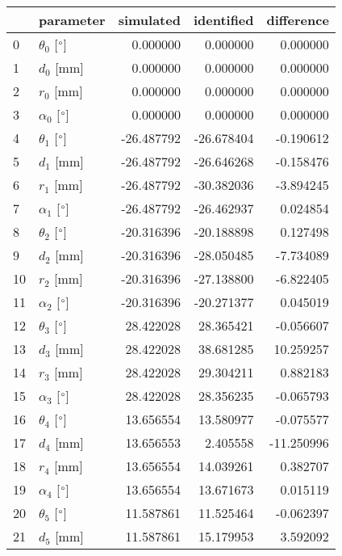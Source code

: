 \documentclass{standalone}%
\begin{document}
%
\normalsize%
\begin{tabular}{llrrr}
\toprule
{} &                 parameter &  simulated & identified & difference \\
\midrule
0  &  $\theta_{0}$ [$\degree$] &   0.000000 &   0.000000 &   0.000000 \\
1  &              $d_{0}$ [mm] &   0.000000 &   0.000000 &   0.000000 \\
2  &              $r_{0}$ [mm] &   0.000000 &   0.000000 &   0.000000 \\
3  &  $\alpha_{0}$ [$\degree$] &   0.000000 &   0.000000 &   0.000000 \\
4  &  $\theta_{1}$ [$\degree$] & -26.487792 & -26.678404 &  -0.190612 \\
5  &              $d_{1}$ [mm] & -26.487792 & -26.646268 &  -0.158476 \\
6  &              $r_{1}$ [mm] & -26.487792 & -30.382036 &  -3.894245 \\
7  &  $\alpha_{1}$ [$\degree$] & -26.487792 & -26.462937 &   0.024854 \\
8  &  $\theta_{2}$ [$\degree$] & -20.316396 & -20.188898 &   0.127498 \\
9  &              $d_{2}$ [mm] & -20.316396 & -28.050485 &  -7.734089 \\
10 &              $r_{2}$ [mm] & -20.316396 & -27.138800 &  -6.822405 \\
11 &  $\alpha_{2}$ [$\degree$] & -20.316396 & -20.271377 &   0.045019 \\
12 &  $\theta_{3}$ [$\degree$] &  28.422028 &  28.365421 &  -0.056607 \\
13 &              $d_{3}$ [mm] &  28.422028 &  38.681285 &  10.259257 \\
14 &              $r_{3}$ [mm] &  28.422028 &  29.304211 &   0.882183 \\
15 &  $\alpha_{3}$ [$\degree$] &  28.422028 &  28.356235 &  -0.065793 \\
16 &  $\theta_{4}$ [$\degree$] &  13.656554 &  13.580977 &  -0.075577 \\
17 &              $d_{4}$ [mm] &  13.656553 &   2.405558 & -11.250996 \\
18 &              $r_{4}$ [mm] &  13.656554 &  14.039261 &   0.382707 \\
19 &  $\alpha_{4}$ [$\degree$] &  13.656554 &  13.671673 &   0.015119 \\
20 &  $\theta_{5}$ [$\degree$] &  11.587861 &  11.525464 &  -0.062397 \\
21 &              $d_{5}$ [mm] &  11.587861 &  15.179953 &   3.592092 \\

\end{tabular}
\end{document}
